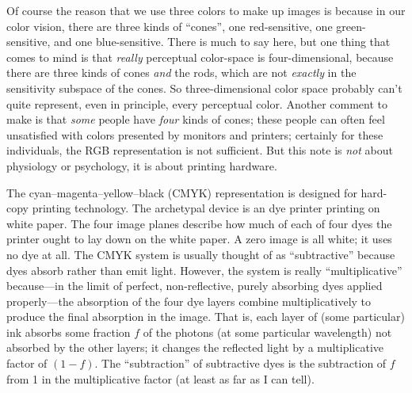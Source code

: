 \documentclass[letterpaper,preprint,dvipdf]{aastex}
\begin{document}
Of course the reason that we use three colors to make up images is
because in our color vision, there are three kinds of ``cones'', one
red-sensitive, one green-sensitive, and one blue-sensitive.  There is
much to say here, but one thing that comes to mind is that
\emph{really} perceptual color-space is four-dimensional, because
there are three kinds of cones \emph{and} the rods, which are not
\emph{exactly} in the sensitivity subspace of the cones.  So
three-dimensional color space probably can't quite represent, even in
principle, every perceptual color.  Another comment to make is that
\emph{some} people have \emph{four} kinds of cones; these people can
often feel unsatisfied with colors presented by monitors and printers;
certainly for these individuals, the RGB representation is not
sufficient.  But this note is \emph{not} about physiology or
psychology, it is about printing hardware.

The cyan--magenta--yellow--black (CMYK) representation is designed for
hard-copy printing technology.  The archetypal device is an dye
printer printing on white paper.  The four image planes describe how
much of each of four dyes the printer ought to lay down on the white
paper.  A zero image is all white; it uses no dye at all.  The CMYK
system is usually thought of as ``subtractive'' because dyes absorb
rather than emit light.  However, the system is really
``multiplicative'' because---in the limit of perfect, non-reflective,
purely absorbing dyes applied properly---the absorption of the four
dye layers combine multiplicatively to produce the final absorption in
the image.  That is, each layer of (some particular) ink absorbs some
fraction $f$ of the photons (at some particular wavelength) not
absorbed by the other layers; it changes the reflected light by a
multiplicative factor of $(1-f)$.  The ``subtraction'' of subtractive
dyes is the subtraction of $f$ from 1 in the multiplicative factor (at
least as far as I can tell).
\end{document}
